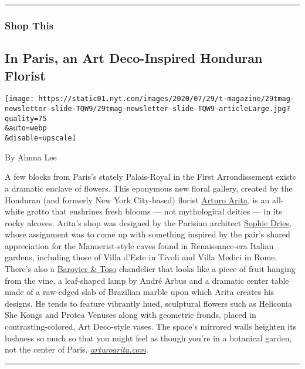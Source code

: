 \begin{center}\rule{0.5\linewidth}{\linethickness}\end{center}

\hypertarget{shop-this}{%
\subsubsection{Shop This}\label{shop-this}}

\hypertarget{in-paris-an-art-deco-inspired-honduran-florist}{%
\subsection{In Paris, an Art Deco-Inspired Honduran
Florist}\label{in-paris-an-art-deco-inspired-honduran-florist}}

\texttt{[image: https://static01.nyt.com/images/2020/07/29/t-magazine/29tmag-newsletter-slide-TQW9/29tmag-newsletter-slide-TQW9-articleLarge.jpg?quality=75\\\&auto=webp\\\&disable=upscale]}

By Ahnna Lee

A few blocks from Paris's stately Palais-Royal in the First
Arrondissement exists a dramatic enclave of flowers. This eponymous new
floral gallery, created by the Honduran (and formerly New York
City-based) florist \href{https://www.instagram.com/arturoarita/}{Arturo
Arita}, is an all-white grotto that enshrines fresh blooms --- not
mythological deities --- in its rocky alcoves. Arita's shop was designed
by the Parisian architect \href{https://www.sophiedries.com/}{Sophie
Dries}, whose assignment was to come up with something inspired by the
pair's shared appreciation for the Mannerist-style caves found in
Renaissance-era Italian gardens, including those of Villa d'Este in
Tivoli and Villa Medici in Rome. There's also a
\href{https://www.barovier.com/en/collections/chandeliers}{Barovier \&
Toso} chandelier that looks like a piece of fruit hanging from the vine,
a leaf-shaped lamp by André Arbus and a dramatic center table made of a
raw-edged slab of Brazilian marble upon which Arita creates his designs.
He tends to feature vibrantly hued, sculptural flowers such as Heliconia
She Kongs and Protea Venuses along with geometric fronds, placed in
contrasting-colored, Art Deco-style vases. The space's mirrored walls
heighten its lushness so much so that you might feel as though you're in
a botanical garden, not the center of Paris.
\href{https://www.arturoarita.com/}{\emph{arturoarita.com}}\emph{.}

\begin{center}\rule{0.5\linewidth}{\linethickness}\end{center}

